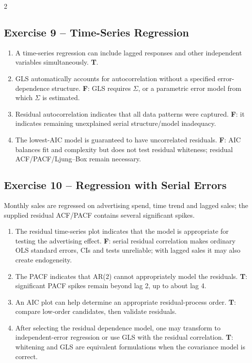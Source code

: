 \documentclass[9pt,a4paper]{extarticle}
\begin{document}
\begin{multicols}{2}
\subsection*{Exercise 9 -- Time-Series Regression}
\begin{enumerate}[label=\alph*),leftmargin=4mm]
\item A time-series regression can include lagged responses and other independent variables simultaneously. \textbf{T}.
\item GLS automatically accounts for autocorrelation without a specified error-dependence structure. \textbf{F}: GLS requires \(\Sigma\), or a parametric error model from which \(\Sigma\) is estimated.
\item Residual autocorrelation indicates that all data patterns were captured. \textbf{F}: it indicates remaining unexplained serial structure/model inadequacy.
\item The lowest-AIC model is guaranteed to have uncorrelated residuals. \textbf{F}: AIC balances fit and complexity but does not test residual whiteness; residual ACF/PACF/Ljung--Box remain necessary.
\end{enumerate}

\subsection*{Exercise 10 -- Regression with Serial Errors}
Monthly sales are regressed on advertising spend, time trend and lagged sales; the supplied residual ACF/PACF contains several significant spikes.
\begin{enumerate}[label=\alph*),leftmargin=4mm]
\item The residual time-series plot indicates that the model is appropriate for testing the advertising effect. \textbf{F}: serial residual correlation makes ordinary OLS standard errors, CIs and tests unreliable; with lagged sales it may also create endogeneity.
\item The PACF indicates that AR(2) cannot appropriately model the residuals. \textbf{T}: significant PACF spikes remain beyond lag 2, up to about lag 4.
\item An AIC plot can help determine an appropriate residual-process order. \textbf{T}: compare low-order candidates, then validate residuals.
\item After selecting the residual dependence model, one may transform to independent-error regression or use GLS with the residual correlation. \textbf{T}: whitening and GLS are equivalent formulations when the covariance model is correct.
\end{enumerate}


\end{multicols}
\end{document}
